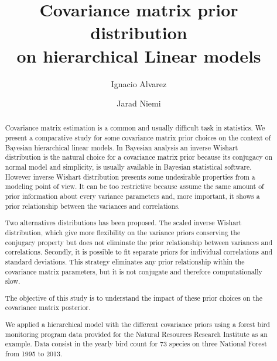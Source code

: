 \documentclass{article}
\title{ Covariance matrix prior distribution \\ on hierarchical Linear models }
\author{Ignacio Alvarez \and Jarad Niemi}
\date{}
\begin{document}
\maketitle 
\thispagestyle{empty}

\begin{abstract}
Covariance matrix estimation is a common and usually difficult task in statistics. We present a comparative study for some covariance matrix prior choices on the context of Bayesian hierarchical linear models. In Bayesian analysis an inverse Wishart distribution is the natural choice for a covariance matrix prior because its conjugacy on normal model and simplicity, is usually available in Bayesian statistical software. However inverse Wishart distribution presents some undesirable properties from a modeling point of view. It can be too restrictive because assume the same amount of prior information about every variance parameters and, more important, it shows a prior relationship between the variances and correlations.

Two alternatives distributions has been proposed. The scaled inverse Wishart distribution, which give more flexibility on the variance priors conserving the conjugacy property but does not eliminate the prior relationship between variances and correlations. Secondly, it is possible to fit separate priors for individual correlations and standard deviations. This strategy eliminates any prior relationship within the covariance matrix parameters, but it is not conjugate and therefore computationally slow. 

The objective of this study is to understand the impact of these prior choices on the covariance matrix posterior.

We applied a hierarchical model with the different covariance priors using a forest bird monitoring program data provided for the Natural Resources Research Institute as an example. Data consist in the yearly bird count for 73 species on three National Forest from 1995 to 2013.
\end{abstract}
\end{document}
